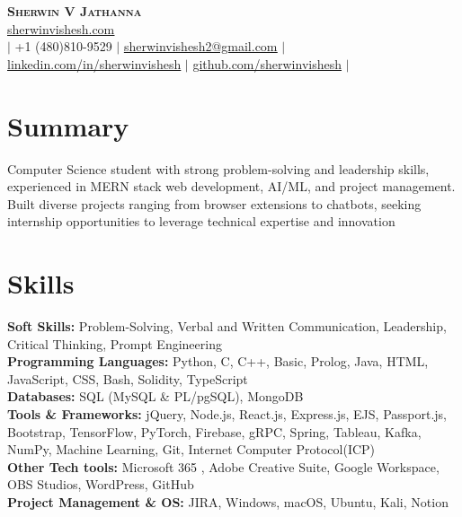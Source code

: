 \documentclass[letterpaper,11pt]{article}
\begin{document}

\begin{center}
    \textbf{\Huge \scshape Sherwin V Jathanna} \\ \vspace{1pt}
     \href{https://sherwinvishesh.com}{\underline{sherwinvishesh.com}} 
   \\ \small $|$ +1 (480)810-9529 $|$ \href{mailto:sherwinvishesh2@gmail.com}{\underline{sherwinvishesh2@gmail.com}} $|$ 
    \href{https://linkedin.com/in/sherwinvishesh}{\underline{linkedin.com/in/sherwinvishesh}} $|$
    \href{https://github.com/sherwinvishesh}{\underline{github.com/sherwinvishesh}} $|$
     \\ 
\end{center}


\section{Summary}

    

Computer Science student with strong problem-solving and leadership skills, experienced in MERN stack web development, AI/ML, and project management. Built diverse projects ranging from browser extensions to chatbots, seeking internship opportunities to leverage technical expertise and innovation

\section{Skills}
 \begin{itemize}[leftmargin=0.15in, label={}]
    \small{\item{
    \textbf{Soft Skills:}{ Problem-Solving, Verbal and Written Communication, Leadership, Critical Thinking, Prompt Engineering} \\
     \textbf{Programming Languages:}{ Python, C, C++, Basic, Prolog, Java, HTML, JavaScript, CSS,  Bash, Solidity, TypeScript} \\
     \textbf{Databases:}{ SQL (MySQL \& PL/pgSQL), MongoDB} \\
     \textbf{Tools \& Frameworks:}{ jQuery, Node.js, React.js, Express.js, EJS, Passport.js, Bootstrap, TensorFlow, PyTorch, Firebase, gRPC, Spring, Tableau, Kafka, NumPy, Machine Learning, Git,  Internet Computer Protocol(ICP) } \\
     \textbf{Other Tech tools:}{ Microsoft 365 , Adobe Creative Suite, Google Workspace, OBS Studios, WordPress, GitHub } \\
     \textbf{Project Management \& OS: }{ JIRA, Windows, macOS, Ubuntu, Kali, Notion}
    }}
 \end{itemize}
\end{document}
